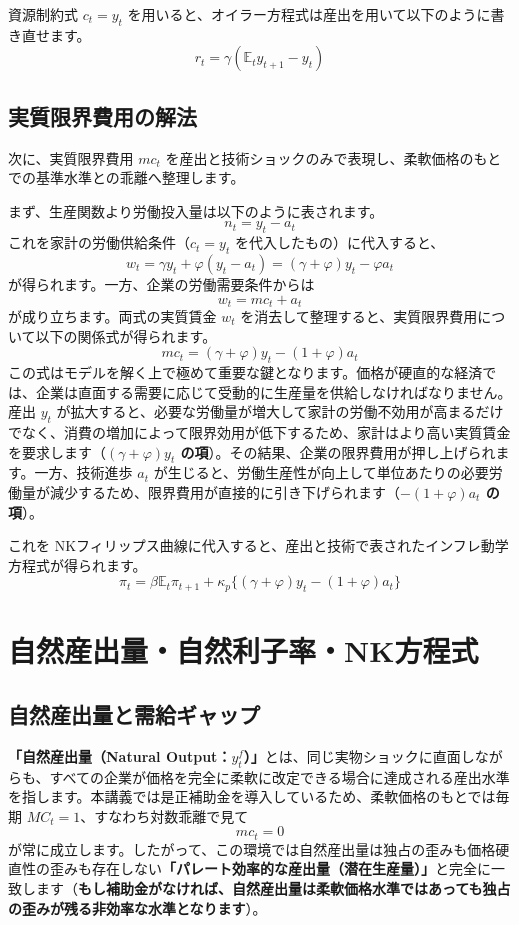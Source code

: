 \documentclass[
  japanese,
  lualatex,
  ja=standard,
  12pt,
  a4paper]{ltjsarticle}
\begin{document}
資源制約式 \(c_t=y_t\)
を用いると、オイラー方程式は産出を用いて以下のように書き直せます。 \[
r_t=\gamma\left(\mathbb{E}_t y_{t+1}-y_t\right)
\]

\subsection{実質限界費用の解法}\label{ux5b9fux8ceaux9650ux754cux8cbbux7528ux306eux89e3ux6cd5}

次に、実質限界費用 \(mc_t\)
を産出と技術ショックのみで表現し、柔軟価格のもとでの基準水準との乖離へ整理します。

まず、生産関数より労働投入量は以下のように表されます。 \[
n_t=y_t-a_t
\] これを家計の労働供給条件（\(c_t=y_t\) を代入したもの）に代入すると、
\[
w_t=\gamma y_t+\varphi(y_t-a_t)
=(\gamma+\varphi)y_t-\varphi a_t
\] が得られます。一方、企業の労働需要条件からは \[
w_t=mc_t+a_t
\] が成り立ちます。両式の実質賃金 \(w_t\)
を消去して整理すると、実質限界費用について以下の関係式が得られます。 \[
mc_t=
(\gamma+\varphi)y_t-(1+\varphi)a_t
\]
この式はモデルを解く上で極めて重要な鍵となります。価格が硬直的な経済では、企業は直面する需要に応じて受動的に生産量を供給しなければなりません。産出
\(y_t\)
が拡大すると、必要な労働量が増大して家計の労働不効用が高まるだけでなく、消費の増加によって限界効用が低下するため、家計はより高い実質賃金を要求します（\textbf{\((\gamma+\varphi)y_t\)
の項}）。その結果、企業の限界費用が押し上げられます。一方、技術進歩
\(a_t\)
が生じると、労働生産性が向上して単位あたりの必要労働量が減少するため、限界費用が直接的に引き下げられます（\textbf{\(-(1+\varphi)a_t\)
の項}）。

これを
NKフィリップス曲線に代入すると、産出と技術で表されたインフレ動学方程式が得られます。
\[
\pi_t=
\beta\mathbb{E}_t\pi_{t+1}
+\kappa_p\{(\gamma+\varphi)y_t-(1+\varphi)a_t\}
\]

\section{自然産出量・自然利子率・NK方程式}\label{ux81eaux7136ux7523ux51faux91cfux81eaux7136ux5229ux5b50ux7387nkux65b9ux7a0bux5f0f}

\subsection{自然産出量と需給ギャップ}\label{ux81eaux7136ux7523ux51faux91cfux3068ux9700ux7d66ux30aeux30e3ux30c3ux30d7}

\textbf{「自然産出量（Natural
Output：\(y_t^f\)）」}とは、同じ実物ショックに直面しながらも、すべての企業が価格を完全に柔軟に改定できる場合に達成される産出水準を指します。本講義では是正補助金を導入しているため、柔軟価格のもとでは毎期
\(MC_t=1\)、すなわち対数乖離で見て \[
mc_t=0
\]
が常に成立します。したがって、この環境では自然産出量は独占の歪みも価格硬直性の歪みも存在しない\textbf{「パレート効率的な産出量（潜在生産量）」}と完全に一致します（\textbf{もし補助金がなければ、自然産出量は柔軟価格水準ではあっても独占の歪みが残る非効率な水準となります}）。
\end{document}

